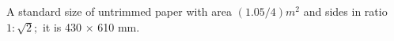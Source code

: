 A standard size of untrimmed paper with area $(1.05/4)m^{2}$  and sides in ratio
$ 1 : \sqrt{2} ; $ it is 430 \ensuremath{ \times } 610  mm.